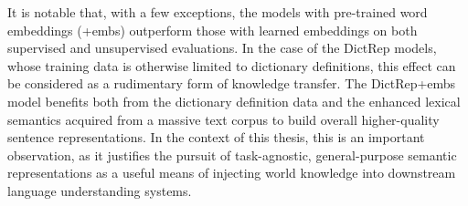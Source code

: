   
%
%
%
%
%
%

\vspace{35pt} It is notable that, with a few exceptions, the models with pre-trained word embeddings (+embs) outperform those with learned embeddings on both supervised and unsupervised evaluations. In the case of the DictRep models, whose training data is otherwise limited to dictionary definitions, this effect can be considered as a rudimentary form of knowledge transfer. The DictRep+embs model benefits both from the dictionary definition data and the enhanced lexical semantics acquired from a massive text corpus to build overall higher-quality sentence representations. In the context of this thesis, this is an important observation, as it justifies the pursuit of task-agnostic, general-purpose semantic representations as a useful means of injecting world knowledge into downstream language understanding systems. 


